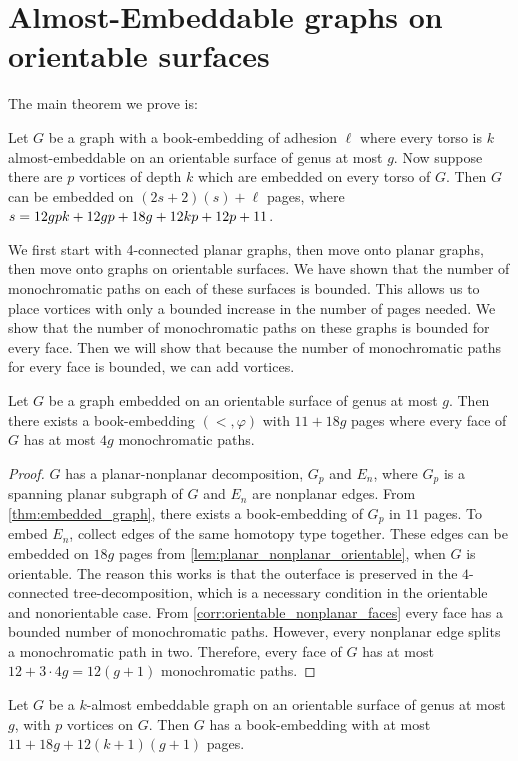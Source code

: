 \section{Almost-Embeddable graphs on orientable surfaces}

The main theorem we prove is:
\begin{theorem}\label{thm:orientablevortices}
	Let $G$ be a graph with a book-embedding of adhesion $\ell$ where every torso is $k$ almost-embeddable on an orientable surface of genus at most $g$. Now suppose there are $p$ vortices of depth $k$ which are embedded on every torso of $G$. Then $G$ can be embedded on $(2s + 2)(s) + \ell$ pages, where $s = 12gpk + 12gp + 18g + 12kp + 12p + 11$. 
\end{theorem}
We first start with 4-connected planar graphs, then move onto planar graphs, then move onto graphs on orientable surfaces. We have shown that the number of monochromatic paths on each of these surfaces is bounded. This allows us to place vortices with only a bounded increase in the number of pages needed. We show that the number of monochromatic paths on these graphs is bounded for every face. Then we will show that because the number of monochromatic paths for every face is bounded, we can add vortices.

\begin{lemma}\label{lem:orientablesurfaces_monochromatic_edges}
	Let $G$ be a graph embedded on an orientable surface of genus at most $g$. Then there exists a book-embedding $(<, \varphi)$ with $11 + 18g$ pages where every face of $G$ has at most $4g$ monochromatic paths.
\end{lemma}
\begin{proof}
	$G$ has a planar-nonplanar decomposition, $G_p$ and $E_n$, where $G_p$ is a spanning planar subgraph of $G$ and $E_n$ are nonplanar edges. From \cref{thm:embedded_graph}, there exists a book-embedding of $G_p$ in $11$ pages. To embed $E_n$, collect edges of the same homotopy type together. These edges can be embedded on $18g$ pages from \cref{lem:planar_nonplanar_orientable}, when $G$ is orientable. The reason this works is that the outerface is preserved in the $4$-connected tree-decomposition, which is a necessary condition in the orientable and nonorientable case.
	From \cref{corr:orientable_nonplanar_faces} every face has a bounded number of monochromatic paths. However, every nonplanar edge splits a monochromatic path in two. Therefore, every face of $G$ has at most $12 + 3 \cdot 4g = 12(g + 1)$ monochromatic paths.
\end{proof}
\begin{lemma}\label{lem:orientablesurfaces_almostembeddable}
	Let $G$ be a $k$-almost embeddable graph on an orientable surface of genus at most $g$, with $p$ vortices on $G$. Then $G$ has a book-embedding with at most $11 + 18g + 12(k + 1)(g + 1)$ pages.
\end{lemma}

